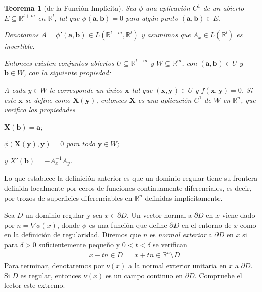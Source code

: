 \documentclass{report}
\newcommand{\realNumbers}{\mathbb{R}}
\newtheorem{theorem}{Teorema}
\theoremstyle{definition}
\theoremstyle{remark}
\begin{document}
  \begin{theorem}[de la Función Implícita]
    Sea \(\phi\) una aplicación \(C^1\) de un abierto \(E \subseteq \realNumbers^{l + m}\) en \(\realNumbers^l\), tal que \(\phi(\mathbf{a}, \mathbf{b}) = 0\) para algún punto \((\mathbf{a}, \mathbf{b}) \in E\).

    Denotamos \(A = \phi'(\mathbf{a}, \mathbf{b}) \in L(\realNumbers^{l + m}, \realNumbers^l)\) y asumimos que \(A_x \in L(\realNumbers^l)\) es invertible.

    Entonces existen conjuntos abiertos \(U \subseteq \realNumbers^{l + m}\) y \(W \subseteq \realNumbers^m\), con \((\mathbf{a}, \mathbf{b}) \in U\) y \(\mathbf{b} \in W\), con la siguiente propiedad:

    A cada \(y \in W\) le corresponde un único \(\mathbf{x}\) tal que \((\mathbf{x}, \mathbf{y}) \in U\) y \(f(\mathbf{x}, \mathbf{y}) = 0\).
    Si este \(\mathbf{x}\) se define como \(\mathbf{X}(\mathbf{y})\), entonces \(\mathbf{X}\) es una aplicación \(C^1\) de \(W\) en \(\realNumbers^n\), que verifica las propiedades
    \begin{enumerate*}
      \item \(\mathbf{X}(\mathbf{b}) = \mathbf{a}\);
      \item \(\phi(\mathbf{X}(\mathbf{y}), \mathbf{y}) = 0\) para todo \(\mathbf{y} \in W\);
      \item y \(X'(\mathbf{b}) = - A_x^{- 1} A_y\).
    \end{enumerate*}
  \end{theorem}

  Lo que establece la definición anterior es que un dominio regular tiene su frontera definida localmente por ceros de funciones continuamente diferenciales, es decir, por trozos de superficies diferenciables en \(\realNumbers^n\) definidas implicitamente.

  Sea \(D\) un dominio regular y sea \(x \in \partial D\).
  Un vector normal a \(\partial D\) en \(x\) viene dado por \(n = \nabla \phi(x)\), donde \(\phi\) es una función que define \(\partial D\) en el entorno de \(x\) como en la definición de regularidad.
  Diremos que \(n\) es \emph{normal exterior} a \(\partial D\) en \(x\) si para \(\delta > 0\) suficientemente pequeño y \(0 < t < \delta\) se verifican
  \begin{align}
    &x - t n \in D
    &&x + t n \in \realNumbers^n \setminus D
  \end{align}
  Para terminar, denotaremos por \(\nu(x)\) a la normal exterior unitaria en \(x\) a \(\partial D\).
  Si \(D\) es regular, entonces \(\nu(x)\) es un campo continuo en \(\partial D\).
  Compruebe el lector este extremo.
\end{document}
